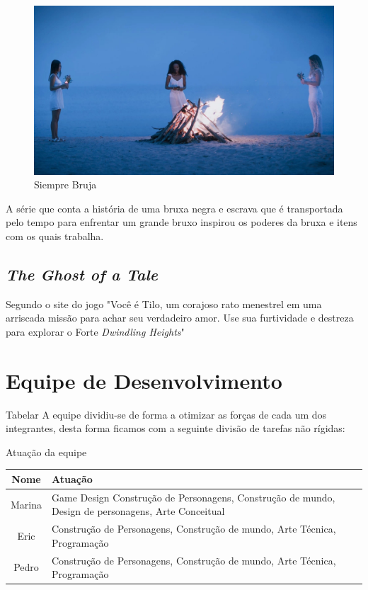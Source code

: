 \begin{figure}[htb]
	\caption{\label{siempre}Siempre Bruja}
	\begin{center}
	    \includegraphics[width=\textwidth]{imagens/SiempreBruja.jpg}
	\end{center}
\end{figure}

A série que conta a história de uma bruxa negra e escrava que é transportada  pelo tempo para enfrentar um grande bruxo inspirou os poderes da bruxa e itens com os quais trabalha. 

\vfill
\pagebreak

\subsection{\textit{The Ghost of a Tale}}
Segundo o site do jogo  "Você é Tilo, um corajoso rato menestrel em uma arriscada missão para achar seu verdadeiro amor. Use sua furtividade e destreza para explorar o Forte \textit{Dwindling Heights}"


\section{Equipe de Desenvolvimento}
Tabelar
A equipe dividiu-se de forma a otimizar as forças de cada um dos integrantes, desta forma ficamos com a seguinte divisão de tarefas não rígidas:

\begin{quadro}[htb]
\caption{\label{quadro_atuacao}Atuação da equipe}
\begin{tabularx}{\textwidth}{|c|X|}
	\hline
	\textbf{Nome} & \textbf{Atuação}\\ \hline
    Marina & Game Design Construção de Personagens, Construção de mundo, Design de personagens, Arte Conceitual \\ \hline
    Eric   & Construção de Personagens, Construção de mundo, Arte Técnica, Programação                                        \\ \hline
    Pedro  & Construção de Personagens, Construção de mundo, Arte Técnica, Programação \\ \hline
\end{tabularx}
\end{quadro}